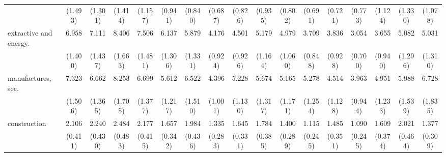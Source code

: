 {\begin{tabular}{l*{16}{c}}
                    &     (1.493)         &     (1.301)         &     (1.414)         &     (1.157)         &     (0.941)         &     (0.840)         &     (0.687)         &     (0.826)         &     (0.935)         &     (0.802)         &     (0.691)         &     (0.721)         &     (0.773)         &     (1.124)         &     (1.330)         &     (1.078)         \\
[1em]
extractive and energy.&       6.958\sym{***}&       7.111\sym{***}&       8.406\sym{***}&       7.506\sym{***}&       6.137\sym{***}&       5.879\sym{***}&       4.176\sym{***}&       4.501\sym{***}&       5.179\sym{***}&       4.979\sym{***}&       3.709\sym{***}&       3.836\sym{***}&       3.054\sym{***}&       3.655\sym{***}&       5.082\sym{***}&       5.031\sym{***}\\
                    &     (1.400)         &     (1.437)         &     (1.663)         &     (1.481)         &     (1.306)         &     (1.331)         &     (0.924)         &     (0.926)         &     (1.164)         &     (1.060)         &     (0.848)         &     (0.928)         &     (0.700)         &     (0.940)         &     (1.296)         &     (1.310)         \\
[1em]
manufactures, sec.  &       7.323\sym{***}&       6.662\sym{***}&       8.253\sym{***}&       6.699\sym{***}&       5.612\sym{***}&       6.522\sym{***}&       4.396\sym{***}&       5.228\sym{***}&       5.674\sym{***}&       5.165\sym{***}&       5.278\sym{***}&       4.514\sym{***}&       3.963\sym{***}&       4.951\sym{***}&       5.988\sym{***}&       6.728\sym{***}\\
                    &     (1.506)         &     (1.365)         &     (1.705)         &     (1.377)         &     (1.217)         &     (1.510)         &     (1.001)         &     (1.130)         &     (1.317)         &     (1.171)         &     (1.254)         &     (1.128)         &     (0.944)         &     (1.233)         &     (1.539)         &     (1.835)         \\
[1em]
construction        &       2.106\sym{***}&       2.240\sym{***}&       2.484\sym{***}&       2.177\sym{***}&       1.657\sym{*}  &       1.984\sym{**} &       1.335         &       1.645\sym{*}  &       1.784\sym{**} &       1.400         &       1.115         &       1.485         &       1.090         &       1.609\sym{*}  &       2.021\sym{**} &       1.377         \\
                    &     (0.411)         &     (0.430)         &     (0.483)         &     (0.415)         &     (0.342)         &     (0.436)         &     (0.283)         &     (0.331)         &     (0.385)         &     (0.289)         &     (0.245)         &     (0.351)         &     (0.245)         &     (0.374)         &     (0.464)         &     (0.309)         \\

\end{tabular}}
